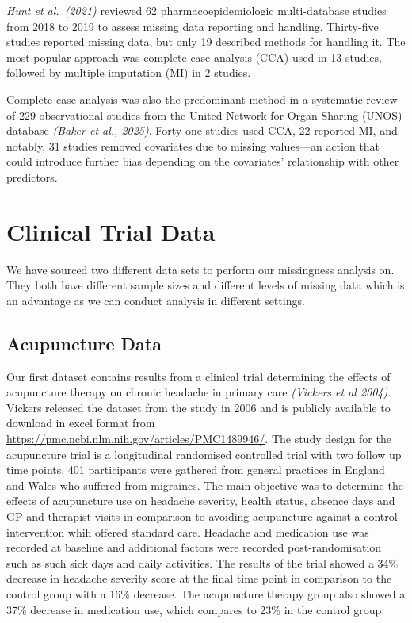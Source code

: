 \documentclass{article}
\begin{document}
\emph{Hunt et al.~(2021)} reviewed 62 pharmacoepidemiologic
multi-database studies from 2018 to 2019 to assess missing data
reporting and handling. Thirty-five studies reported missing data, but
only 19 described methods for handling it. The most popular approach was
complete case analysis (CCA) used in 13 studies, followed by multiple
imputation (MI) in 2 studies.

Complete case analysis was also the predominant method in a systematic
review of 229 observational studies from the United Network for Organ
Sharing (UNOS) database \emph{(Baker et al., 2025)}. Forty-one studies
used CCA, 22 reported MI, and notably, 31 studies removed covariates due
to missing values---an action that could introduce further bias
depending on the covariates' relationship with other predictors.

\newpage

\section{Clinical Trial Data}\label{clinical-trial-data}

We have sourced two different data sets to perform our missingness
analysis on. They both have different sample sizes and different levels
of missing data which is an advantage as we can conduct analysis in
different settings.

\subsection{Acupuncture Data}\label{acupuncture-data}

Our first dataset contains results from a clinical trial determining the
effects of acupuncture therapy on chronic headache in primary care
\emph{(Vickers et al 2004)}. Vickers released the dataset from the study
in 2006 and is publicly available to download in excel format from
\url{https://pmc.ncbi.nlm.nih.gov/articles/PMC1489946/}. The study
design for the acupuncture trial is a longitudinal randomised controlled
trial with two follow up time points. 401 participants were gathered
from general practices in England and Wales who suffered from migraines.
The main objective was to determine the effects of acupuncture use on
headache severity, health status, absence days and GP and therapist
visits in comparison to avoiding acupuncture against a control
intervention whih offered standard care. Headache and medication use was
recorded at baseline and additional factors were recorded
post-randomisation such as such sick days and daily activities. The
results of the trial showed a 34\% decrease in headache severity score
at the final time point in comparison to the control group with a 16\%
decrease. The acupuncture therapy group also showed a 37\% decrease in
medication use, which compares to 23\% in the control group.
\end{document}
